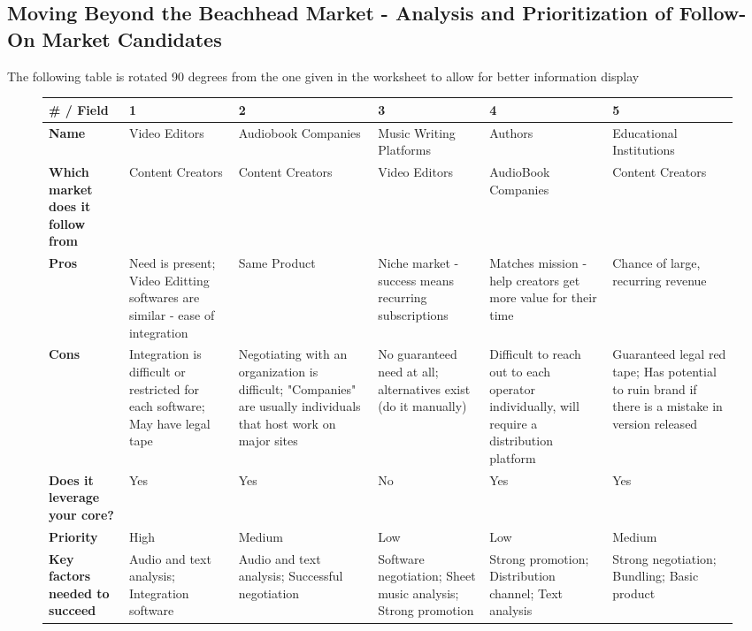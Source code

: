 \documentclass{article}
\begin{document}
    \subsection{Moving Beyond the Beachhead Market - Analysis and Prioritization of Follow-On Market Candidates}
        The following table is rotated 90 degrees from the one given in the worksheet to allow for better information display
        \begin{figure}[h!]
            \begin{center}
                \begin{tabular} { | p{1.75cm} | p{2cm} | p{2cm} | p{2cm} | p{2cm} | p{2cm} |}
                    \hline
                    \textbf{\# / Field} & 1 & 2 & 3 & 4 & 5
                    \\ \hline
                    \textbf{Name} & \raggedright Video Editors & \raggedright Audiobook Companies & \raggedright Music Writing Platforms & \raggedright Authors & \raggedright Educational Institutions
                    \tabularnewline \hline
                    \raggedright \textbf{Which market does it follow from} & \raggedright Content Creators & \raggedright Content Creators & \raggedright Video Editors & \raggedright AudioBook Companies & \raggedright Content Creators 
                    \tabularnewline \hline
                    \textbf{Pros} & \raggedright Need is present; Video Editting softwares are similar - ease of integration & \raggedright Same Product & \raggedright Niche market - success means recurring subscriptions & \raggedright Matches mission - help creators get more value for their time & \raggedright Chance of large, recurring revenue 
                    \tabularnewline \hline
                    \textbf{Cons} & \raggedright Integration is difficult or restricted for each software; May have legal tape & \raggedright Negotiating with an organization is difficult; "Companies" are usually individuals that host work on major sites & \raggedright No guaranteed need at all; alternatives exist (do it manually) & \raggedright Difficult to reach out to each operator individually, will require a distribution platform & \raggedright Guaranteed legal red tape; Has potential to ruin brand if there is a mistake in version released
                    \tabularnewline \hline
                    \raggedright \textbf{Does it leverage your core?} & Yes & Yes & No & Yes & Yes
                    \tabularnewline \hline
                    \textbf{Priority} & High & Medium & Low & Low & Medium
                    \tabularnewline \hline
                    \raggedright \textbf{Key factors needed to succeed} & \raggedright Audio and text analysis; Integration software & \raggedright Audio and text analysis; Successful negotiation & \raggedright Software negotiation; Sheet music analysis; Strong promotion & \raggedright Strong promotion; Distribution channel; Text analysis & \raggedright Strong negotiation; Bundling; Basic product

\end{tabular}
\end{center}
\end{figure}
\end{document}

